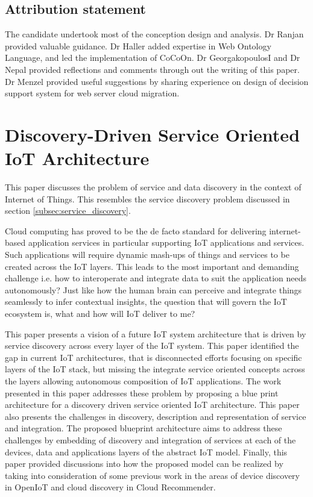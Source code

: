 \subsection{Attribution statement}
The candidate undertook most of the conception design and analysis. 
Dr Ranjan provided valuable guidance. 
Dr Haller added expertise in Web Ontology Language, and led the implementation of CoCoOn.
Dr GeorgakopoulosI and Dr Nepal provided reflections and comments through out the writing of this paper.
Dr Menzel provided useful suggestions by sharing experience on design of decision support system for web server cloud migration.
  
\section{Discovery-Driven Service Oriented IoT Architecture}
\label{paper:soa_iot}

This paper discusses the problem of service and data discovery in the context of Internet of Things. This resembles the service discovery problem discussed in section \ref{subsec:service_discovery}.

Cloud computing has proved to be the de facto standard for delivering internet-based application services in particular supporting IoT applications and services. Such applications will require dynamic mash-ups of things and services to be created across the IoT layers. This leads to the most important and demanding challenge i.e. how to interoperate and integrate data to suit the application needs autonomously? Just like how the human brain can perceive and integrate things seamlessly to infer contextual insights, the question that will govern the IoT ecosystem is, what and how will IoT deliver to me?

This paper presents a vision of a future IoT system architecture that is driven by service discovery across every layer of the IoT system. This paper identified the  gap in current IoT architectures, that is disconnected efforts focusing on specific layers of the IoT stack, but missing the integrate service oriented concepts across the layers allowing autonomous composition of IoT applications. The work presented in this paper addresses these problem by proposing a blue print architecture for a discovery driven service oriented IoT architecture.
This paper also presents the challenges in discovery, description and representation of service and integration. The proposed blueprint architecture aims to address these challenges by embedding of discovery and integration of services at each of the devices, data and applications layers of the abstract IoT model. 
Finally, this paper provided discussions into how the proposed model can be realized by taking into consideration of some previous work in the areas of device discovery in OpenIoT and cloud discovery in Cloud Recommender.


